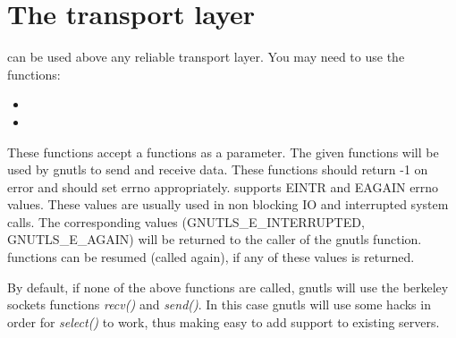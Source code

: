 \section{The transport layer}
\par
\gnutls{} can be used above any reliable transport layer. You may need to
use the functions:
\begin{itemize}
\item {}
\item {}
\end{itemize}
These functions accept a functions as a parameter. The given functions will 
be used by gnutls to send and receive data.
These functions should return -1 on error and should set errno appropriately.
\gnutls{} supports EINTR and EAGAIN errno values. These values are
usually used in non blocking IO and interrupted system calls.
The corresponding values (GNUTLS\_E\_INTERRUPTED, GNUTLS\_E\_AGAIN) 
will be returned to the caller of the gnutls function. \gnutls{} functions
can be resumed (called again), if any of these values is returned.
\par
By default, if none of the above functions are called, gnutls will use
the berkeley sockets functions \emph{recv()} and \emph{send()}. In this case
gnutls will use some hacks in order for \emph{select()} to work, thus
making easy to add \tls{} support to existing servers.
